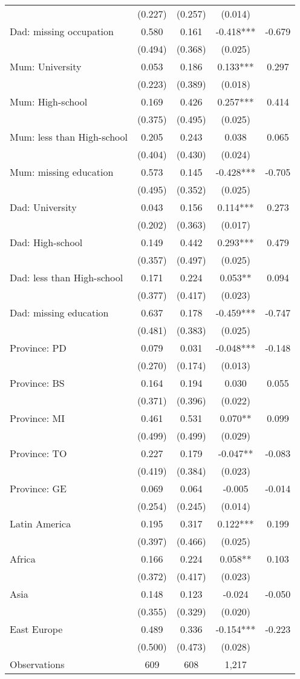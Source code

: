 \begin{tabular}{l*{4}c}
&(0.227)&(0.257)&(0.014)&\\
Dad: missing occupation&0.580&0.161&-0.418***&-0.679\\
&(0.494)&(0.368)&(0.025)&\\
Mum: University&0.053&0.186&0.133***&0.297\\
&(0.223)&(0.389)&(0.018)&\\
Mum: High-school&0.169&0.426&0.257***&0.414\\
&(0.375)&(0.495)&(0.025)&\\
Mum: less than High-school&0.205&0.243&0.038&0.065\\
&(0.404)&(0.430)&(0.024)&\\
Mum: missing education&0.573&0.145&-0.428***&-0.705\\
&(0.495)&(0.352)&(0.025)&\\
Dad: University&0.043&0.156&0.114***&0.273\\
&(0.202)&(0.363)&(0.017)&\\
Dad: High-school&0.149&0.442&0.293***&0.479\\
&(0.357)&(0.497)&(0.025)&\\
Dad: less than High-school&0.171&0.224&0.053**&0.094\\
&(0.377)&(0.417)&(0.023)&\\
Dad: missing education&0.637&0.178&-0.459***&-0.747\\
&(0.481)&(0.383)&(0.025)&\\
Province: PD&0.079&0.031&-0.048***&-0.148\\
&(0.270)&(0.174)&(0.013)&\\
Province: BS&0.164&0.194&0.030&0.055\\
&(0.371)&(0.396)&(0.022)&\\
Province: MI&0.461&0.531&0.070**&0.099\\
&(0.499)&(0.499)&(0.029)&\\
Province: TO&0.227&0.179&-0.047**&-0.083\\
&(0.419)&(0.384)&(0.023)&\\
Province: GE&0.069&0.064&-0.005&-0.014\\
&(0.254)&(0.245)&(0.014)&\\
Latin America&0.195&0.317&0.122***&0.199\\
&(0.397)&(0.466)&(0.025)&\\
Africa&0.166&0.224&0.058**&0.103\\
&(0.372)&(0.417)&(0.023)&\\
Asia&0.148&0.123&-0.024&-0.050\\
&(0.355)&(0.329)&(0.020)&\\
East Europe&0.489&0.336&-0.154***&-0.223\\
&(0.500)&(0.473)&(0.028)&\\
\midrule
Observations & 609 & 608 & 1,217 & \\
\bottomrule
\end{tabular}
